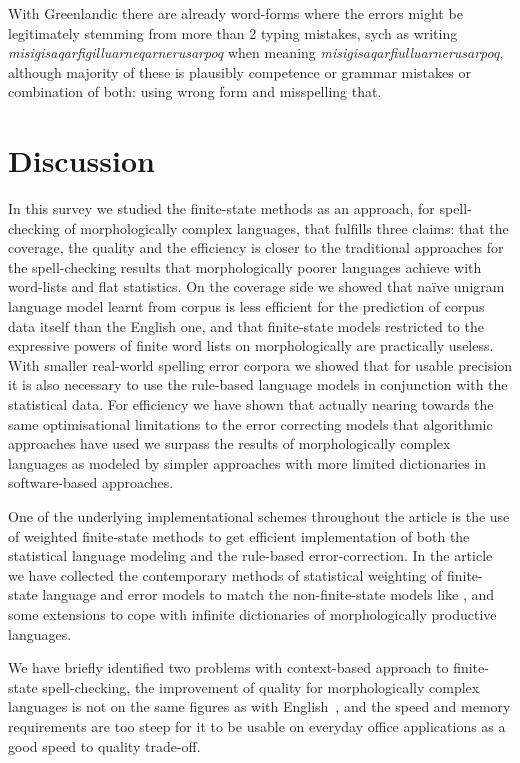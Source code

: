 \documentclass[a4paper,12pt]{article}
\begin{document}
With Greenlandic there are already word-forms where the errors might be
legitimately stemming from more than 2 typing mistakes, sych as writing 
\emph{misigisaqarfigilluarneqarnerusarpoq} when meaning 
\emph{misigisaqarfiulluarnerusarpoq}, although majority of these is plausibly
competence or grammar mistakes or combination of both: using wrong form and
misspelling that.


\section{Discussion}
\label{sec:discussion}

In this survey we studied the finite-state methods as an approach, for
spell-checking of morphologically complex languages, that fulfills three
claims: that the coverage, the quality and the efficiency is closer to the
traditional approaches for the spell-checking results that morphologically
poorer languages achieve with word-lists and flat statistics. On the coverage
side we showed that naïve unigram language model learnt from corpus is
less efficient for the prediction of corpus data itself than the English one,
and that finite-state models restricted to the expressive powers of finite
word lists on morphologically are practically useless. With smaller real-world
spelling error corpora we showed that for usable precision it is also necessary
to use the rule-based language models in conjunction with the statistical
data. For efficiency we have shown that actually nearing towards the same
optimisational limitations to the error correcting models that algorithmic
approaches have used we surpass the results of morphologically complex 
languages as modeled by simpler approaches with more limited dictionaries in
software-based approaches.

One of the underlying implementational schemes throughout the article is the
use of weighted finite-state methods to get efficient implementation of both
the statistical language modeling and the rule-based error-correction. In the
article we have collected the contemporary methods of statistical weighting of
finite-state language and error models to match the non-finite-state models
like \cite{church1991probability}, and some extensions to cope with infinite
dictionaries of morphologically productive languages.

We have briefly identified two problems with context-based approach to
finite-state spell-checking, the improvement of quality for morphologically
complex languages is not on the same figures as with
English~\cite{wilcoxohearn2008realword}, and the speed and memory requirements
are too steep for it to be usable on everyday office applications as a good
speed to quality trade-off.
\end{document}
